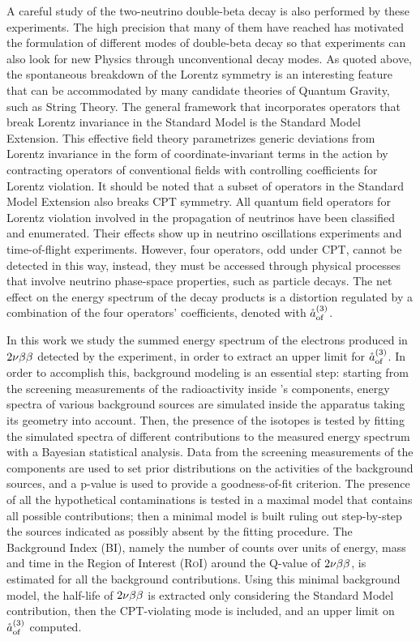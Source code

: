 	A careful study of the two-neutrino double-beta decay is also performed by these experiments. The high precision that many of them have reached has motivated the formulation of different modes of double-beta decay so that experiments can also look for new Physics through unconventional decay modes. As quoted above, the spontaneous breakdown of the Lorentz symmetry is an interesting feature that can be accommodated by many candidate theories of Quantum Gravity, such as String Theory. The general framework that incorporates operators that break Lorentz invariance in the Standard Model is the Standard Model Extension. This effective field theory parametrizes generic deviations from Lorentz invariance in the form of coordinate-invariant terms in the action by contracting operators of conventional fields with controlling coefficients for Lorentz violation. It should be noted that a subset of operators in the Standard Model Extension also breaks CPT symmetry. All quantum field operators for Lorentz violation involved in the propagation of neutrinos have been classified and enumerated. Their effects show up in neutrino oscillations experiments and time-of-flight experiments. However, four operators, odd under CPT, cannot be detected in this way, instead, they must be accessed through physical processes that involve neutrino phase-space properties, such as particle decays. The net effect on the energy spectrum of the decay products is a distortion regulated by a combination of the four operators' coefficients, denoted with $\mathring{a}_\text{of}^{(3)}$.

	In this work we study the summed energy spectrum of the electrons produced in $2\nu\beta\beta$ detected by the {\gerda} experiment, in order to extract an upper limit for $\mathring{a}_\text{of}^{(3)}$. In order to accomplish this, background modeling is an essential step: starting from the screening measurements of the radioactivity inside {\gerda}’s components, energy spectra of various background sources are simulated inside the apparatus taking its geometry into account. Then, the presence of the isotopes is tested by fitting the simulated spectra of different contributions to the measured energy spectrum with a Bayesian statistical analysis. Data from the screening measurements of the {\gerda} components are used to set prior distributions on the activities of the background sources, and a p-value is used to provide a goodness-of-fit criterion. The presence of all the hypothetical contaminations is tested in a maximal model that contains all possible contributions; then a minimal model is built ruling out step-by-step the sources indicated as possibly absent by the fitting procedure. The Background Index (BI), namely the number of counts over units of energy, mass and time in the Region of Interest (\textsc{RoI}) around the Q-value of $2\nu\beta\beta$, is estimated for all the background contributions. Using this minimal background model, the half-life of $2\nu\beta\beta$ is extracted only considering the Standard Model contribution, then the CPT-violating mode is included, and an upper limit on $\mathring{a}_\text{of}^{(3)}$ computed.

